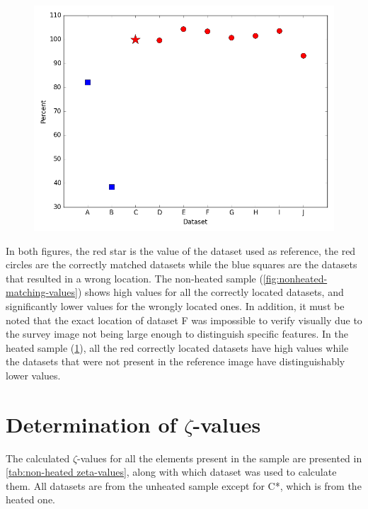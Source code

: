 \begin{figure}
	\centering
	\includegraphics[width=0.7\linewidth]{"fig/heated-matching-values"}
	\caption{}
	\label{fig:heated-matching-values}
\end{figure}


In both figures, the red star is the value of the dataset used as reference, the red circles are the correctly matched datasets while the blue squares are the datasets that resulted in a wrong location. The non-heated sample (\cref{fig:nonheated-matching-values}) shows high values for all the correctly located datasets, and significantly lower values for the wrongly located ones. In addition, it must be noted that the exact location of dataset F was impossible to verify visually due to the survey image not being large enough to distinguish specific features. In the heated sample (\cref{fig:heated-matching-values}), all the red correctly located datasets have high values while the datasets that were not present in the reference image have distinguishably lower values.

\section{Determination of $\zeta$-values}

The calculated $\zeta$-values for all the elements present in the sample are presented in \cref{tab:non-heated zeta-values}, along with which dataset was used to calculate them. All datasets are from the unheated sample except for C*, which is from the heated one.

